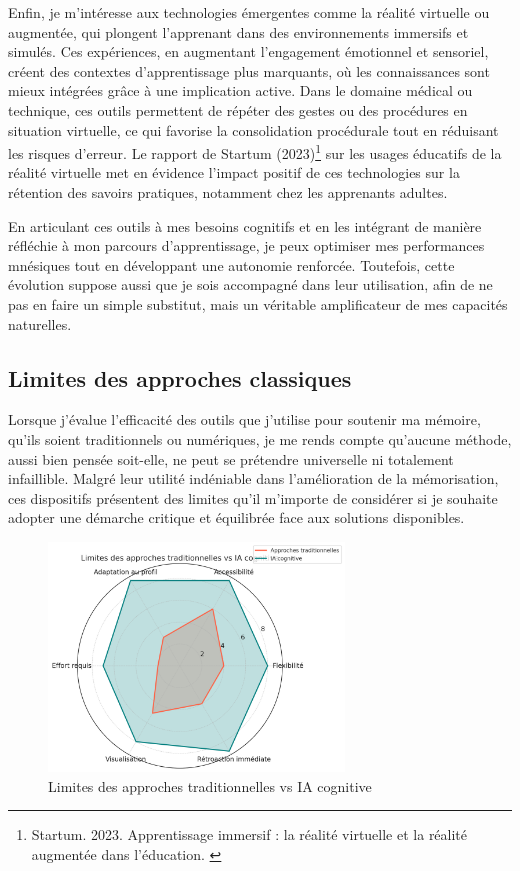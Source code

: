\documentclass[11pt,a4paper]{report}
\begin{document}
Enfin, je m’intéresse aux technologies émergentes comme la réalité virtuelle ou augmentée, qui plongent l’apprenant dans des environnements immersifs et simulés. Ces expériences, en augmentant l’engagement émotionnel et sensoriel, créent des contextes d’apprentissage plus marquants, où les connaissances sont mieux intégrées grâce à une implication active. Dans le domaine médical ou technique, ces outils permettent de répéter des gestes ou des procédures en situation virtuelle, ce qui favorise la consolidation procédurale tout en réduisant les risques d’erreur. Le rapport de Startum (2023)\footnote{Startum. 2023. Apprentissage immersif : la réalité virtuelle et la réalité augmentée dans l'éducation. \cite{startum}} sur les usages éducatifs de la réalité virtuelle met en évidence l’impact positif de ces technologies sur la rétention des savoirs pratiques, notamment chez les apprenants adultes.

En articulant ces outils à mes besoins cognitifs et en les intégrant de manière réfléchie à mon parcours d’apprentissage, je peux optimiser mes performances mnésiques tout en développant une autonomie renforcée. Toutefois, cette évolution suppose aussi que je sois accompagné dans leur utilisation, afin de ne pas en faire un simple substitut, mais un véritable amplificateur de mes capacités naturelles.

\subsection{Limites des approches classiques}

Lorsque j’évalue l’efficacité des outils que j’utilise pour soutenir ma mémoire, qu’ils soient traditionnels ou numériques, je me rends compte qu’aucune méthode, aussi bien pensée soit-elle, ne peut se prétendre universelle ni totalement infaillible. Malgré leur utilité indéniable dans l’amélioration de la mémorisation, ces dispositifs présentent des limites qu’il m’importe de considérer si je souhaite adopter une démarche critique et équilibrée face aux solutions disponibles.

\begin{figure}[h]
    \centering
    \includegraphics[width=0.7\textwidth]{images/1.3.3.png}
    \caption{Limites des approches traditionnelles vs IA cognitive}
    \label{fig:1.3.3}
\end{figure}
\end{document}
